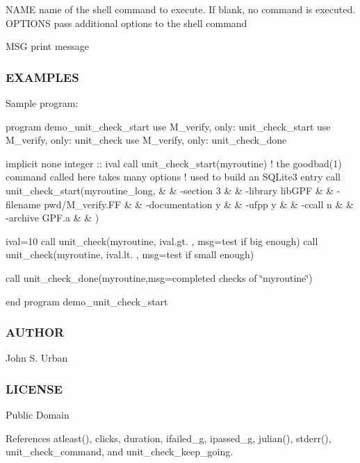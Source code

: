N\+A\+ME name of the shell command to execute. If blank, no command is executed. O\+P\+T\+I\+O\+NS pass additional options to the shell command

M\+SG print message

\subsubsection*{E\+X\+A\+M\+P\+L\+ES}

Sample program\+:

program demo\+\_\+unit\+\_\+check\+\_\+start use M\+\_\+verify, only\+: unit\+\_\+check\+\_\+start use M\+\_\+verify, only\+: unit\+\_\+check use M\+\_\+verify, only\+: unit\+\_\+check\+\_\+done

implicit none integer \+:\+: ival call unit\+\_\+check\+\_\+start(\textquotesingle{}myroutine\textquotesingle{}) ! the goodbad(1) command called here takes many options ! used to build an S\+Q\+Lite3 entry call unit\+\_\+check\+\_\+start(\textquotesingle{}myroutine\+\_\+long\textquotesingle{},\textquotesingle{} \& \& -\/section 3 \& \& -\/library lib\+G\+PF \& \& -\/filename {\ttfamily pwd}/\+M\+\_\+verify.FF \& \& -\/documentation y \& \& -\/ufpp y \& \& -\/ccall n \& \& -\/archive G\+P\+F.\+a \& \& \textquotesingle{})

ival=10 call unit\+\_\+check(\textquotesingle{}myroutine\textquotesingle{}, ival.\+gt. , msg=\textquotesingle{}test if big enough\textquotesingle{}) call unit\+\_\+check(\textquotesingle{}myroutine\textquotesingle{}, ival.\+lt. , msg=\textquotesingle{}test if small enough\textquotesingle{})

call unit\+\_\+check\+\_\+done(\textquotesingle{}myroutine\textquotesingle{},msg=\textquotesingle{}completed checks of \char`\"{}myroutine\char`\"{}\textquotesingle{})

end program demo\+\_\+unit\+\_\+check\+\_\+start

\subsubsection*{A\+U\+T\+H\+OR}

John S. Urban \subsubsection*{L\+I\+C\+E\+N\+SE}

Public Domain 

References atleast(), clicks, duration, ifailed\+\_\+g, ipassed\+\_\+g, julian(), stderr(), unit\+\_\+check\+\_\+command, and unit\+\_\+check\+\_\+keep\+\_\+going.

